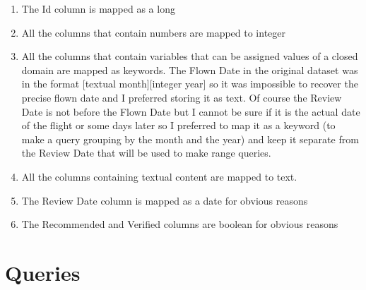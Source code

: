 \documentclass{Configuration_Files/PoliMi3i_thesis}
\begin{document}
\begin{enumerate}
    \item The Id column is mapped as a long
    \item All the columns that contain numbers are mapped to integer
    \item All the columns that contain variables that can be assigned values of a closed domain are mapped as keywords. 
    The Flown Date in the original dataset was in the format [textual month][integer year] so it was impossible to recover the precise flown date and I preferred storing it as text. Of course the Review Date is not before the Flown Date but I cannot be sure if it is the actual date of the flight or some days later so I preferred to map it as a keyword (to make a query grouping by the month and the year) and keep it separate from the Review Date that will be used to make range queries.
    \item All the columns containing textual content are mapped to text. 
    \item The Review Date column is mapped as a date for obvious reasons
    \item The Recommended and Verified columns are boolean for obvious reasons
    
\end{enumerate}


\chapter{Queries}
\end{document}
